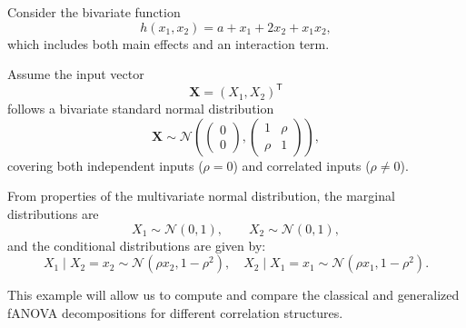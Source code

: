 \begin{example}\label{ex:running_example}
Consider the bivariate function
\begin{equation}\label{eq:running_example_function}
    h(x_1, x_2) = a + x_1 + 2x_2 + x_1 x_2,
\end{equation}
which includes both main effects and an interaction term.

Assume the input vector
\[
\boldsymbol{X} = (X_1, X_2)^\mathsf{T}
\]
follows a bivariate standard normal distribution
\[
\boldsymbol{X} \sim \mathcal{N}\!\left(
\begin{pmatrix}0 \\ 0\end{pmatrix},
\begin{pmatrix}
1 & \rho \\ 
\rho & 1
\end{pmatrix}
\right),
\]
covering both independent inputs ($\rho = 0$) and correlated inputs ($\rho \neq 0$).

From properties of the multivariate normal distribution, the marginal distributions are
\[
X_1 \sim \mathcal{N}(0,1), \qquad X_2 \sim \mathcal{N}(0,1),
\]
and the conditional distributions are given by:
\[
X_1 \mid X_2=x_2 \sim \mathcal{N}(\rho x_2, 1-\rho^2), \quad
X_2 \mid X_1=x_1 \sim \mathcal{N}(\rho x_1, 1-\rho^2).
\]
\end{example}



This example will allow us to compute and compare the classical and generalized fANOVA decompositions for different correlation structures.

